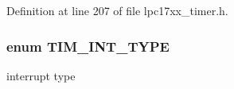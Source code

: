 \-Definition at line 207 of file lpc17xx\-\_\-timer.\-h.

\hypertarget{group___t_i_m___public___types_ga2fd69882c6757b73b5728fd321d3104c}{
\subsubsection[{\-T\-I\-M\-\_\-\-I\-N\-T\-\_\-\-T\-Y\-P\-E}]{\setlength{\rightskip}{0pt plus 5cm}enum {\bf \-T\-I\-M\-\_\-\-I\-N\-T\-\_\-\-T\-Y\-P\-E}}}\label{group___t_i_m___public___types_ga2fd69882c6757b73b5728fd321d3104c}


interrupt type 

